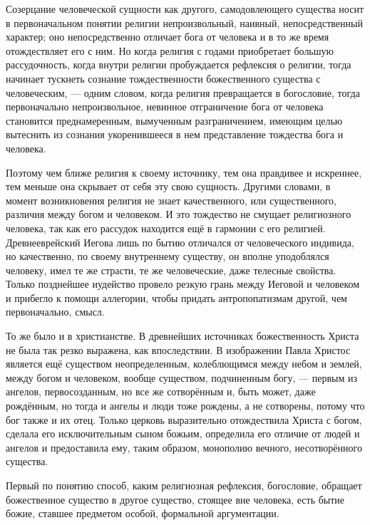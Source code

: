 \documentclass[12pt,oneside]{book}
\begin{document}
Созерцание человеческой сущности как другого, самодовлеющего существа носит в первоначальном понятии религии непроизвольный, наивный, непосредственный характер; оно непосредственно отличает бога от человека и в то же время отождествляет его с ним. Но когда религия с годами приобретает большую рассудочность, когда внутри религии пробуждается рефлексия о религии, тогда начинает тускнеть сознание тождественности божественного существа с человеческим, --- одним словом, когда религия превращается в богословие, тогда первоначально непроизвольное, невинное отграничение бога от человека становится преднамеренным, вымученным разграничением, имеющим целью вытеснить из сознания укоренившееся в нем представление тождества бога и человека.

Поэтому чем ближе религия к своему источнику, тем она правдивее и искреннее, тем меньше она скрывает от себя эту свою сущность. Другими словами, в момент возникновения религия не знает качественного, или существенного, различия между богом и человеком. И это тождество не смущает религиозного человека, так как его рассудок находится ещё в гармонии с его религией. Древнееврейский Иегова лишь по бытию отличался от человеческого индивида, но качественно, по своему внутреннему существу, он вполне уподоблялся человеку, имел те же страсти, те же человеческие, даже телесные свойства. Только позднейшее иудейство провело резкую грань между Иеговой и человеком и прибегло к помощи аллегории, чтобы придать антропопатизмам другой, чем первоначально, смысл.

То же было и в христианстве. В древнейших источниках божественность Христа не была так резко выражена, как впоследствии. В изображении Павла Христос является ещё существом неопределенным, колеблющимся между небом и землей, между богом и человеком, вообще существом, подчиненным богу, --- первым из ангелов, первосозданным, но все же сотворённым и, быть может, даже рождённым, но тогда и ангелы и люди тоже рождены, а не сотворены, потому что бог также и их отец. Только церковь выразительно отождествила Христа с богом, сделала его исключительным сыном божьим, определила его отличие от людей и ангелов и предоставила ему, таким образом, монополию вечного, несотворённого существа.

Первый по понятию способ, каким религиозная рефлексия, богословие, обращает божественное существо в другое существо, стоящее вне человека, есть бытие божие, ставшее предметом особой, формальной аргументации.
\end{document}
